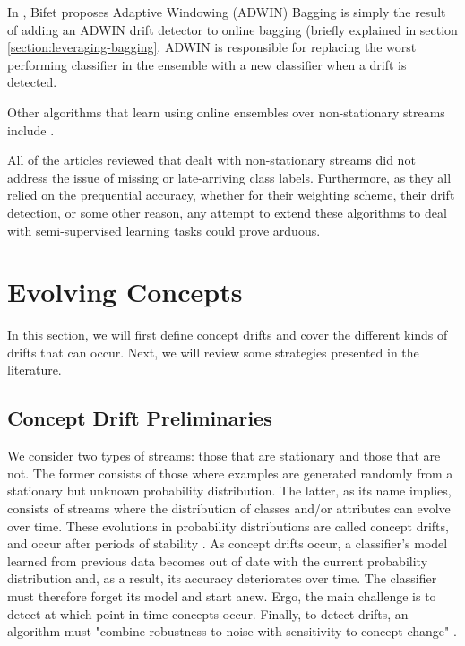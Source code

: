 In \cite{bifet2009new}, Bifet proposes Adaptive Windowing (ADWIN) Bagging is simply the result of adding an ADWIN drift detector to online bagging (briefly explained in section \ref{section:leveraging-bagging}. ADWIN is responsible for replacing the worst performing classifier in the ensemble with a new classifier when a drift is detected.

Other algorithms that learn using online ensembles over non-stationary streams include \cite{BRZEZINSKI201450, Kolter:2005:UAE:1102351.1102408, Kolter20072755, kuncheva2004classifier, minku2012ddd, stanley2003learning, yoshida2011adaptive}.

All of the articles reviewed that dealt with non-stationary streams did not address the issue of missing or late-arriving class labels. Furthermore, as they all relied on the prequential accuracy, whether for their weighting scheme, their drift detection, or some other reason, any attempt to extend these algorithms to deal with semi-supervised learning tasks could prove arduous.

\section{Evolving Concepts\label{section:concept_drift}}
In this section, we will first define concept drifts and cover the different kinds of drifts that can occur. Next, we will review some strategies presented in the literature.

\subsection{Concept Drift Preliminaries}

We consider two types of streams: those that are stationary and those that are not. The former consists of those where examples are generated randomly from a stationary but unknown probability distribution. The latter, as its name implies, consists of streams where the distribution of classes and/or attributes can evolve over time. These evolutions in probability distributions are called concept drifts, and occur after periods of stability \cite{gama2010knowledge, KRAWCZYK2017132}. As concept drifts occur, a classifier's model learned from previous data becomes out of date with the current probability distribution and, as a result, its accuracy deteriorates over time. The classifier must therefore forget its model and start anew.
Ergo, the main challenge is to detect at which point in time concepts occur. Finally, to detect drifts, an algorithm must "combine robustness to noise with sensitivity to concept change" \cite{gama2010knowledge}.

